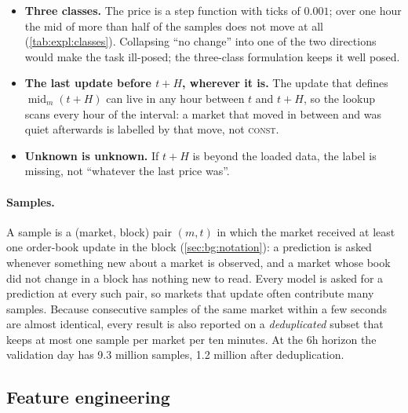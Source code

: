 \begin{itemize}[nosep]
  \item \textbf{Three classes.}  The price is a step function with ticks of $0.001$;
  over one hour the mid of more than half of the samples does not move at all
  (\cref{tab:expl:classes}).  Collapsing ``no change'' into one of the two directions
  would make the task ill-posed; the three-class formulation keeps it well posed.
  \item \textbf{The last update before $t+H$, wherever it is.}  The update that defines
  $\operatorname{mid}_m(t+H)$ can live in any hour between $t$ and $t+H$, so the lookup
  scans every hour of the interval: a market that moved in between and was quiet
  afterwards is labelled by that move, not \textsc{const}.
  \item \textbf{Unknown is unknown.}  If $t+H$ is beyond the loaded data, the label is
  missing, not ``whatever the last price was''.
\end{itemize}


\paragraph{Samples.}  A sample is a (market, block) pair $(m, t)$ in which the market
received at least one order-book update in the block (\cref{sec:bg:notation}): a
prediction is asked whenever something new about a market is observed, and a market whose
book did not change in a block has nothing new to read.  Every model is asked for a
prediction at every such pair, so markets that update often contribute many samples.  Because consecutive
samples of the same market within a few seconds are almost identical, every result is
also reported on a \emph{deduplicated} subset that keeps at most one sample per market
per ten minutes.  At the 6h horizon the validation day has 9.3 million samples, 1.2
million after deduplication.

\subsection{Feature engineering}
\label{sec:prep:features}

